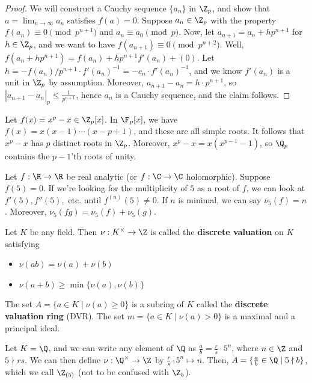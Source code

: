 \begin{proof}
    We will construct a Cauchy sequence $\{a_n\}$ in $\Z_p$, and show that $a = \lim_{n \to \infty}a_n$ satisfies $f(a)=0$. Suppose $a_n \in \Z_p$ with the property $f(a_n) \equiv 0 \pmod {p^{n+1}}$ and $a_n \equiv a_0 \pmod p$. Now, let $a_{n+1}=a_n + hp^{n+1}$ for $h \in \Z_p$, and we want to have $f(a_{n+1}) \equiv 0 \pmod {p^{n+2}}$. Well, $f(a_n+hp^{n+1})=f(a_n) + hp^{n+1}f'(a_n)+(0)$. Let $h = -f(a_n)/p^{n+1} \cdot f'(a_n)^{-1}=-c_n\cdot f'(a_n)^{-1}$, and we know $f'(a_n)$ is a unit in $\Z_p$ by assumption. Moreover, $a_{n+1}-a_n=h\cdot p^{n+1}$, so $|a_{n+1}-a_n|_p \leq \frac{1}{p^{n+1}}$, hence $a_n$ is a Cauchy sequence, and the claim follows.
\end{proof}

\begin{ex}
    Let $f(x) = x^p-x \in \Z_p[x]$. In $\F_p[x]$, we have $f(x) = x(x-1)\cdots (x-p+1)$, and these are all simple roots. It follows that $x^p-x$ has $p$ distinct roots in $\Z_p$. Moreover, $x^p-x=x(x^{p-1}-1)$, so $\Q_p$ contains the $p-1$'th roots of unity.
\end{ex}

\begin{ex}
    Let $f:\R\to \R$ be real analytic (or $f: \C \to \C$ holomorphic). Suppose $f(5) =0$. If we're looking for the multiplicity of $5$ as a root of $f$, we can look at $f'(5),f''(5),$ etc. until $f^{(n)}(5)\neq 0$. If $n$ is minimal, we can say $\nu_5(f)=n$. Moreover, $\nu_5(fg)=\nu_5(f) + \nu_5(g)$.
\end{ex}

\begin{ex}
    Let $K$ be any field. Then $\nu: K^\times \to \Z$ is called the \textbf{discrete valuation} on $K$ satisfying
    \begin{itemize}
        \item $\nu(ab) = \nu(a) + \nu(b)$
        \item $\nu(a+b) \geq \min \{\nu (a),\nu (b)\}$
    \end{itemize}
    The set $A = \{a \in K \mid \nu(a) \geq 0\}$ is a subring of $K$ called the \textbf{discrete valuation ring} (DVR).
    The set $m = \{ a \in K \mid \nu(a) > 0\}$ is a maximal and a principal ideal.
\end{ex}

\begin{ex}
    Let $K = \Q$, and we can write any element of $\Q$ as $\frac{a}{b}=\frac{r}{s}\cdot 5^n$, where $n \in \Z$ and $5 \nmid rs$. We can then define $\nu: \Q^\times \to \Z$ by $\frac{r}{s}\cdot 5^n \mapsto n$. Then, $A=\{\frac{a}{b} \in \Q \mid 5 \nmid b\}$, which we call $\Z_{(5)}$ (not to be confused with $\Z_5$).
\end{ex}

